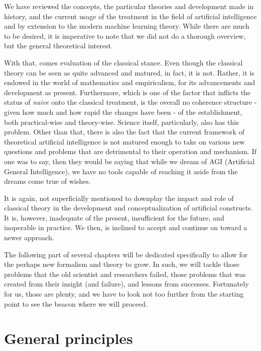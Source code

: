 We have reviewed the concepts, the particular theories and development made in history, and the current usage of the treatment in the field of artificial intelligence and by extension to the modern machine learning theory. While there are much to be desired, it is imperative to note that we did not do a thorough overview, but the general theoretical interest. 

With that, comes evaluation of the classical stance. Even though the classical theory can be seen as quite advanced and matured, in fact, it is not. Rather, it is endowed in the world of mathematics and empiricalism, for its advancements and development as present. Furthermore, which is one of the factor that inflicts the status of \textit{naive} onto the classical treatment, is the overall no coherence structure - given how much and how rapid the changes have been - of the establishment, both practical-wise and theory-wise. Science itself, particularly, also has this problem. Other than that, there is also the fact that the current framework of theoretical artificial intelligence is not matured enough to take on various new questions and problems that are detrimental to their operation and mechanism. If one was to say, then they would be saying that while we dream of AGI (Artificial General Intelligence), we have no tools capable of reaching it aside from the dreams come true of wishes. 

It is again, not superficially mentioned to downplay the impact and role of classical theory in the development and conceptualization of artificial constructs. It is, however, inadequate of the present, insufficient for the future, and inoperable in practice. We then, is inclined to accept and continue on toward a newer approach. 

The following part of several chapters will be dedicated specifically to allow for the perhaps new formalism and theory to grow. In such, we will tackle those problems that the old scientist and researchers failed, those problems that was created from their insight (and failure), and lessons from successes. Fortunately for us, those are plenty, and we have to look not too further from the starting point to see the beacon where we will proceed. 

\chapter{General principles}



